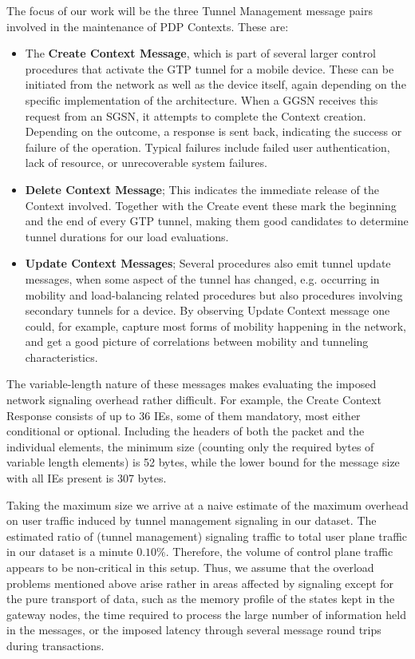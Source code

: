 The focus of our work will be the three Tunnel Management message pairs involved in the maintenance of PDP Contexts. These are:

\begin{itemize}
\item The \textbf{Create Context Message}, which is part of several larger control procedures that activate the GTP tunnel for a mobile device. These can be initiated from the network as well as the device itself, again depending on the specific implementation of the architecture. When a \ac{GGSN} receives this request from an \ac{SGSN}, it attempts to complete the Context creation. Depending on the outcome, a response is sent back, indicating the success or failure of the operation. Typical failures include failed user authentication, lack of resource, or unrecoverable system failures.

\item \textbf{Delete Context Message}; This indicates the immediate release of the Context involved. 
Together with the Create event these mark the beginning and the end of every GTP tunnel, making them good candidates to determine tunnel durations for our load evaluations.

\item \textbf{Update Context Messages}; Several procedures also emit tunnel update messages, when some aspect of the tunnel has changed, e.g. occurring in mobility and load-balancing related procedures but also procedures involving secondary tunnels for a device.
By observing Update Context message one could, for example, capture most forms of mobility happening in the network, and get a good picture of correlations between mobility and tunneling characteristics. 
\end{itemize}

The variable-length nature of these messages makes evaluating the imposed network signaling overhead rather difficult. For example, the Create Context Response consists of up to 36 \acp{IE}, some of them mandatory, most either conditional or optional. Including the headers of both the packet and the individual elements, the minimum size (counting only the required bytes of variable length elements) is 52 bytes, while the lower bound for the message size with all \acp{IE} present is 307 bytes.

Taking the maximum size we arrive at a naive estimate of the maximum overhead on user traffic induced by tunnel management signaling in our dataset. The estimated ratio of (tunnel management) signaling traffic to total user plane traffic in our dataset is a minute $0.10\%$. Therefore, the volume of control plane traffic appears to be non-critical in this setup. Thus, we assume that the overload problems mentioned above arise rather in areas affected by signaling except for the pure transport of data, such as the memory profile of the states kept in the gateway nodes, the time required to process the large number of information held in the messages, or the imposed latency through several message round trips during transactions.


